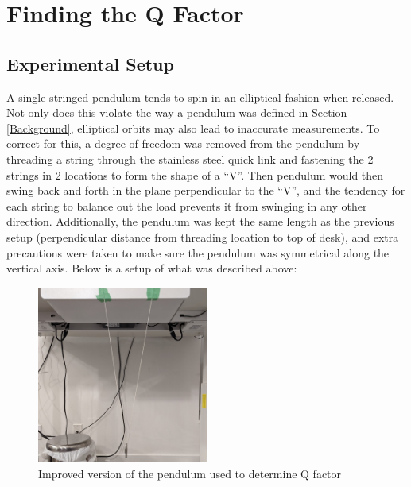 \documentclass[12pt]{article}
\begin{document}
\newpage

\section{Finding the Q Factor} \label{Finding the Q Factor}

\subsection{Experimental Setup}
{\color{blue}
A single-stringed pendulum tends to spin in an elliptical fashion when released. Not only does this violate the way a pendulum was defined in Section \ref{Background}, elliptical orbits may also lead to inaccurate measurements. To correct for this,} a degree of freedom was removed from the pendulum by threading a string through the stainless steel quick link and fastening the 2 strings in 2 locations to form the shape of a ``V''. Then pendulum would then swing back and forth in the plane perpendicular to the ``V'', and the tendency for each string to balance out the load prevents it from swinging in any other direction. Additionally, the pendulum was kept the same length as the previous setup (perpendicular distance from threading location to top of desk), and extra precautions were taken to make sure the pendulum was symmetrical along the vertical axis. Below is a setup of what was described above:
\begin{figure}[!hptb]
    \centering
    \includegraphics[width=0.5\textwidth]{../figures/exp_setup2.jpg}
    \caption{\centering Improved version of the pendulum used to determine Q factor}
    \label{fig:figure 3}
\end{figure}

\newpage
\end{document}
